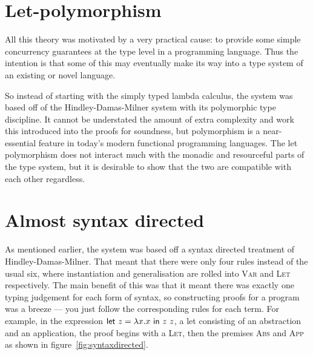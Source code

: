 \section{Let-polymorphism}
All this theory was motivated by a very practical cause: to provide
some simple concurrency guarantees at the type level in a programming
language. Thus the intention is that some of this may eventually make
its way into a type system of an existing or novel language.

So instead of starting with the simply typed lambda calculus, the
system was based off of the Hindley-Damas-Milner system with its
polymorphic type discipline. It cannot be understated the amount of
extra complexity and work this introduced into the proofs for
soundness, but polymorphism is a near-essential feature in today's
modern functional programming languages. The let polymorphism does not
interact much with the monadic and resourceful parts of the type
system, but it is desirable to show that the two are compatible with
each other regardless.

\section{Almost syntax directed}
As mentioned earlier, the system was based off a syntax directed
treatment of Hindley-Damas-Milner. That meant that there were only
four rules instead of the usual six, where instantiation and
generalisation are rolled into \textsc{Var} and \textsc{Let}
respectively. The main benefit of this was that it meant there was
exactly one typing judgement for each form of syntax, so constructing
proofs for a program was a breeze --- you just follow the corresponding rules
for each term. For example, in the expression $\mathsf{let} \ z = \lambda x . x \ \mathsf{in} \ z \
  z$, a let consisting of an abstraction and an application, the proof begins with a
\textsc{Let}, then the premises \textsc{Abs} and \textsc{App} as shown
in figure~\ref{fig:syntaxdirected}.


